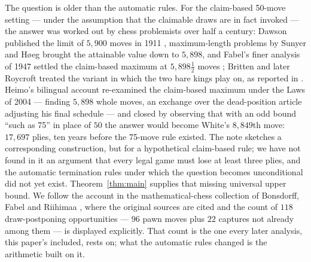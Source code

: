 \documentclass[11pt]{article}
\theoremstyle{definition}
\theoremstyle{remark}
\theoremstyle{plain}
\begin{document}
The question is older than the automatic rules. For the claim-based
50-move setting --- under the assumption that the claimable draws are in
fact invoked --- the answer was worked out by chess problemists over half
a century: Dawson published the limit of $5{,}900$ moves in 1911
\cite{dawson1911}, maximum-length problems by Sunyer and H{\o}eg brought
the attainable value down to $5{,}898$, and Fabel's finer analysis of
1947 settled the claim-based maximum at $5{,}898\tfrac12$ moves
\cite{fabel1947}; Britten and later Roycroft treated the variant in
which the two bare kings play on, as reported in \cite{bonsdorff1974}.
Heimo's bilingual account \cite{heimo2004} re-examined the claim-based
maximum under the Laws of 2004 --- finding $5{,}898$ whole moves, an
exchange over the dead-position article adjusting his final schedule ---
and closed by observing that with an odd bound ``such as 75'' in place
of $50$ the answer would become White's $8{,}849$th move: $17{,}697$
plies, ten years before the 75-move rule existed. The note sketches a
corresponding construction, but for a hypothetical claim-based rule; we
have not found in it an argument that every legal game must lose at
least three plies, and the automatic termination rules under which the
question becomes unconditional did not yet exist.
Theorem~\ref{thm:main} supplies that missing universal upper bound. We
follow the
account in the mathematical-chess collection of Bonsdorff, Fabel and
Riihimaa \cite{bonsdorff1974}, where the original sources are cited and
the count of $118$ draw-postponing opportunities --- $96$ pawn moves plus
$22$ captures not already among them --- is displayed explicitly. That
count is the one every later analysis, this paper's included, rests on;
what the automatic rules changed is the arithmetic built on it.
\end{document}
